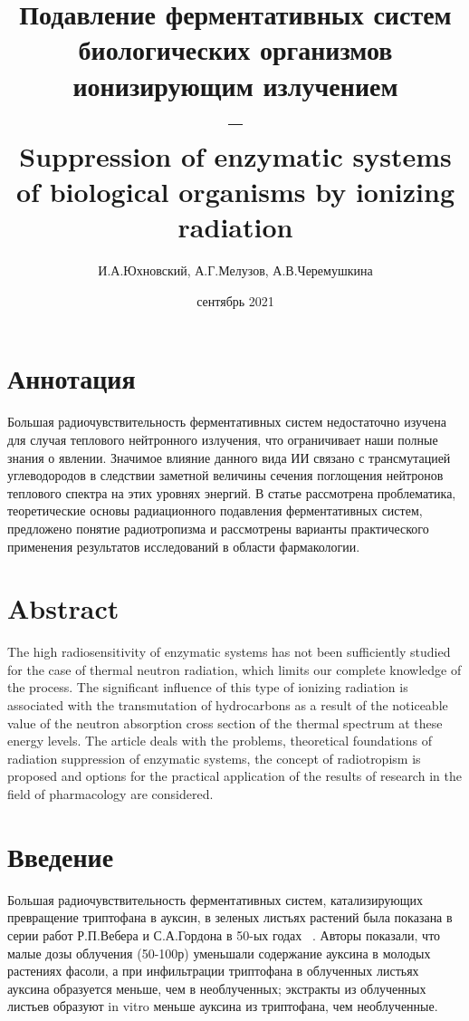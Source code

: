 \documentclass[11pt]{article}
\title{\textbf{Подавление ферментативных систем биологических организмов ионизирующим излучением \\ -- \\ 
	Suppression of enzymatic systems of biological organisms by ionizing radiation}}
\author{И.А.Юхновский, А.Г.Мелузов, А.В.Черемушкина}
\date{сентябрь 2021}
\begin{document}
\maketitle
\thispagestyle{empty}
\section*{Аннотация}
Большая радиочувствительность ферментативных систем недостаточно изучена для случая теплового нейтронного излучения, что ограничивает наши полные знания о явлении. Значимое влияние данного вида ИИ связано с трансмутацией углеводородов в следствии заметной величины сечения поглощения нейтронов теплового спектра на этих уровнях энергий. В статье рассмотрена проблематика, теоретические основы радиационного подавления ферментативных систем, предложено понятие радиотропизма и рассмотрены варианты практического применения результатов исследований в области фармакологии.

\section*{Abstract}
The high radiosensitivity of enzymatic systems has not been sufficiently studied for the case of thermal neutron radiation, which limits our complete knowledge of the process. The significant influence of this type of ionizing radiation is associated with the transmutation of hydrocarbons as a result of the noticeable value of the neutron absorption cross section of the thermal spectrum at these energy levels. The article deals with the problems, theoretical foundations of radiation suppression of enzymatic systems, the concept of radiotropism is proposed and options for the practical application of the results of research in the field of pharmacology are considered.

\section{Введение}
Большая радиочувствительность ферментативных систем, катализирующих превращение триптофана в ауксин, в зеленых листьях растений была показана в серии работ Р.П.Вебера и С.А.Гордона в 50-ых годах ~\cite{GORDON}. 
Авторы показали, что малые дозы облучения (50-100р) уменьшали содержание ауксина в молодых растениях фасоли, а при инфильтрации триптофана в облученных листьях ауксина образуется меньше, чем в необлученных; экстракты из облученных листьев образуют in vitro меньше ауксина из триптофана, чем необлученные.
\end{document}
